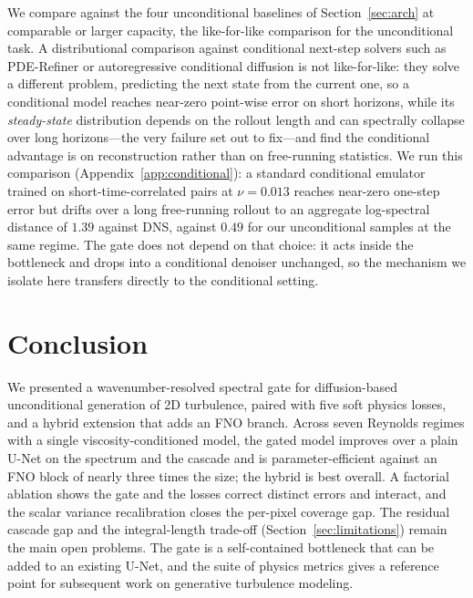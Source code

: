 \documentclass[10pt]{article} %
\begin{document}
We compare against the four unconditional baselines of Section~\ref{sec:arch} at comparable or larger capacity, the like-for-like comparison for the unconditional task. A distributional comparison against conditional next-step solvers such as PDE-Refiner \citep{lippe2023pderefiner} or autoregressive conditional diffusion \citep{kohl2024benchmarking} is not like-for-like: they solve a different problem, predicting the next state from the current one, so a conditional model reaches near-zero point-wise error on short horizons, while its \emph{steady-state} distribution depends on the rollout length and can spectrally collapse over long horizons---the very failure \citet{sambamurthy2025lazy} set out to fix---and \citet{sureshbabu2025guided} find the conditional advantage is on reconstruction rather than on free-running statistics. We run this comparison (Appendix~\ref{app:conditional}): a standard conditional emulator trained on short-time-correlated pairs at $\nu=0.013$ reaches near-zero one-step error but drifts over a long free-running rollout to an aggregate log-spectral distance of $1.39$ against DNS, against $0.49$ for our unconditional samples at the same regime. The gate does not depend on that choice: it acts inside the bottleneck and drops into a conditional denoiser unchanged, so the mechanism we isolate here transfers directly to the conditional setting.

\section{Conclusion}

We presented a wavenumber-resolved spectral gate for diffusion-based unconditional generation of 2D turbulence, paired with five soft physics losses, and a hybrid extension that adds an FNO branch. Across seven Reynolds regimes with a single viscosity-conditioned model, the gated model improves over a plain U-Net on the spectrum and the cascade and is parameter-efficient against an FNO block of nearly three times the size; the hybrid is best overall. A factorial ablation shows the gate and the losses correct distinct errors and interact, and the scalar variance recalibration closes the per-pixel coverage gap. The residual cascade gap and the integral-length trade-off (Section~\ref{sec:limitations}) remain the main open problems. The gate is a self-contained bottleneck that can be added to an existing U-Net, and the suite of physics metrics gives a reference point for subsequent work on generative turbulence modeling.
\end{document}
